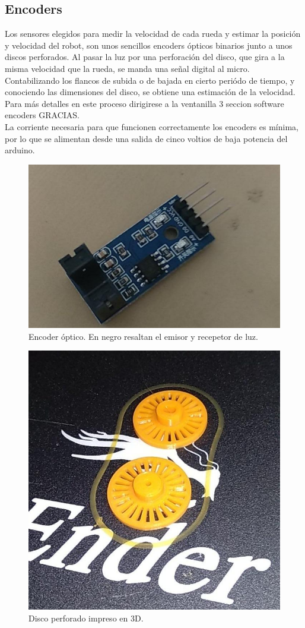 \subsection{Encoders}
Los sensores elegidos para medir la velocidad de cada rueda y estimar la posición y velocidad del robot, son unos sencillos encoders ópticos binarios junto a unos discos perforados. Al pasar la luz por una perforación del disco, que gira a la misma velocidad que la rueda, se manda una señal digital al micro. Contabilizando los flancos de subida o de bajada en cierto periódo de tiempo, y conociendo las dimensiones del disco, se obtiene una estimación de la velocidad. Para más detalles en este proceso dirigirese a la ventanilla 3 seccion software encoders GRACIAS. \\
La corriente necesaria para que funcionen correctamente los encoders es mínima, por lo que se alimentan desde una salida de cinco voltios de baja potencia del arduino.
 \begin{figure}[h!]
 	\centering
 	\includegraphics[width=.6\textwidth]{images/hw/encoder_img}
 	\caption{Encoder óptico. En negro resaltan el emisor y recepetor de luz.}
 \end{figure}
  \begin{figure}[h!]
  	\centering
  	\includegraphics[width=.6\textwidth]{images/hw/encoder_stl}
  	\caption{Disco perforado impreso en 3D.}
  \end{figure}
  
